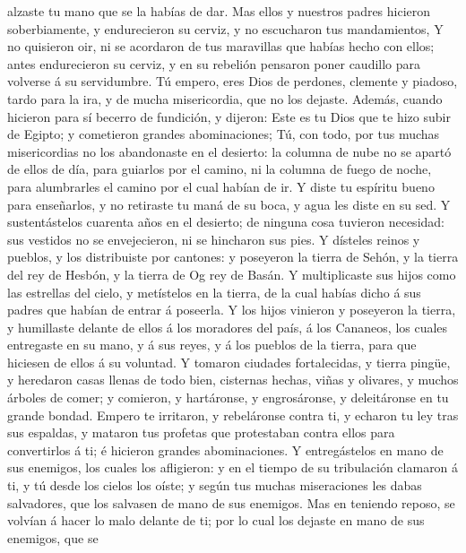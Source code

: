 alzaste tu mano que se la habías de dar.  Mas ellos y
nuestros padres hicieron soberbiamente, y endurecieron su cerviz, y no
escucharon tus mandamientos,  Y no quisieron oir, ni se
acordaron de tus maravillas que habías hecho con ellos; antes
endurecieron su cerviz, y en su rebelión pensaron poner caudillo para
volverse á su servidumbre. Tú empero, eres Dios de perdones, clemente y
piadoso, tardo para la ira, y de mucha misericordia, que no los dejaste.
 Además, cuando hicieron para sí becerro de fundición, y
dijeron: Este es tu Dios que te hizo subir de Egipto; y cometieron
grandes abominaciones;  Tú, con todo, por tus muchas
misericordias no los abandonaste en el desierto: la columna de nube no
se apartó de ellos de día, para guiarlos por el camino, ni la columna de
fuego de noche, para alumbrarles el camino por el cual habían de ir.
 Y diste tu espíritu bueno para enseñarlos, y no
retiraste tu maná de su boca, y agua les diste en su sed.
 Y sustentástelos cuarenta años en el desierto; de
ninguna cosa tuvieron necesidad: sus vestidos no se envejecieron, ni se
hincharon sus pies.  Y dísteles reinos y pueblos, y los
distribuiste por cantones: y poseyeron la tierra de Sehón, y la tierra
del rey de Hesbón, y la tierra de Og rey de Basán.  Y
multiplicaste sus hijos como las estrellas del cielo, y metístelos en la
tierra, de la cual habías dicho á sus padres que habían de entrar á
poseerla.  Y los hijos vinieron y poseyeron la tierra, y
humillaste delante de ellos á los moradores del país, á los Cananeos,
los cuales entregaste en su mano, y á sus reyes, y á los pueblos de la
tierra, para que hiciesen de ellos á su voluntad.  Y
tomaron ciudades fortalecidas, y tierra pingüe, y heredaron casas llenas
de todo bien, cisternas hechas, viñas y olivares, y muchos árboles de
comer; y comieron, y hartáronse, y engrosáronse, y deleitáronse en tu
grande bondad.  Empero te irritaron, y rebeláronse contra
ti, y echaron tu ley tras sus espaldas, y mataron tus profetas que
protestaban contra ellos para convertirlos á ti; é hicieron grandes
abominaciones.  Y entregástelos en mano de sus enemigos,
los cuales los afligieron: y en el tiempo de su tribulación clamaron á
ti, y tú desde los cielos los oíste; y según tus muchas miseraciones les
dabas salvadores, que los salvasen de mano de sus enemigos.
 Mas en teniendo reposo, se volvían á hacer lo malo
delante de ti; por lo cual los dejaste en mano de sus enemigos, que se
